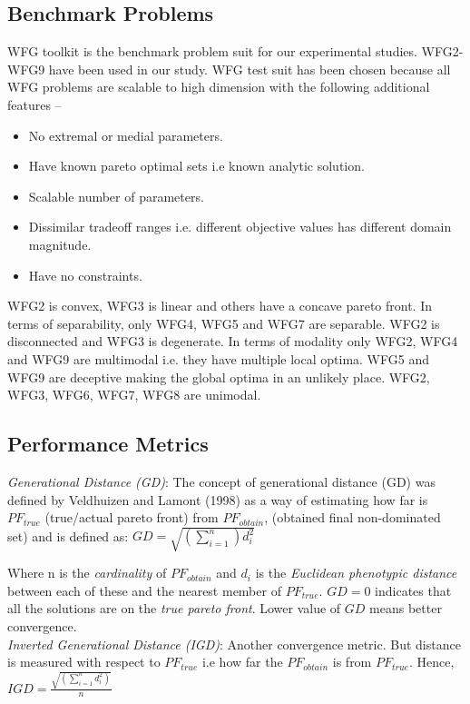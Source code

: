 \documentclass[journal]{IEEEtran}
\begin{document}
\subsection{Benchmark Problems}

WFG toolkit \cite{huband2006review} is the benchmark problem suit for our experimental studies. WFG2-WFG9 have been used in our study. WFG test suit has been chosen because all WFG problems are scalable to high dimension with the following additional features –
\begin{itemize}
\item No extremal or medial parameters.
\item Have known pareto optimal sets i.e known analytic solution.
\item Scalable number of parameters.
\item Dissimilar tradeoff ranges i.e. different objective values has different domain magnitude.
\item Have no constraints.
\end{itemize}
WFG2 is convex, WFG3 is linear and others have a concave pareto front. In terms of separability, only WFG4, WFG5 and WFG7 are separable. WFG2 is disconnected and WFG3 is degenerate. In terms of modality only WFG2, WFG4 and WFG9 are multimodal i.e. they have multiple local optima. WFG5 and WFG9 are deceptive making the global optima in an unlikely place. WFG2, WFG3, WFG6, WFG7, WFG8 are unimodal. 

\subsection{Performance Metrics}

\textit{Generational Distance (GD)}: 
The concept of generational distance (GD) was defined by Veldhuizen and Lamont (1998) as a way of estimating how far is $PF_{true}$ (true/actual pareto front) from $PF_{obtain}$, (obtained final non-dominated set) and is defined as: 
$GD= \sqrt{(\sum\limits_{i=1}^{n}) d_i^2}$

Where n is the \textit{cardinality} of $PF_{obtain}$ and $d_i$ is the \textit{Euclidean phenotypic distance} between each of these and the nearest member of $PF_{true}$. $GD = 0$ indicates that all the solutions are on the \textit{true pareto front}. Lower value of $GD$ means better convergence.\\

\textit{Inverted Generational Distance (IGD)}:
Another convergence metric. But distance is measured with respect to $PF_{true}$ i.e how far the $PF_{obtain}$ is from $PF_{true}$. Hence,
$IGD=\frac{\sqrt{(\sum\limits_{i=1}^{n}d_i^2)}}{n}$
\end{document}
